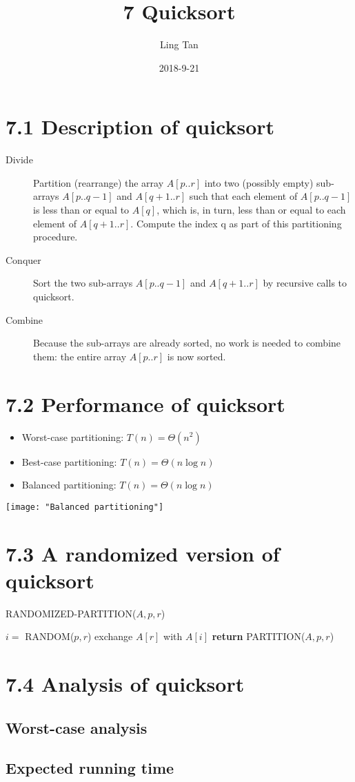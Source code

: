 \documentclass[a4paper]{article}
\title{7 Quicksort}
\author{Ling Tan}
\date{2018-9-21}
\begin{document}
\maketitle

\section*{7.1 Description of quicksort}
\begin{description}
\item[Divide] Partition (rearrange) the array $A[p..r]$ into two (possibly empty) sub-arrays $A[p..q-1]$ and $A[q+1..r]$ such that each element of $A[p..q-1]$ is less than or equal to $A[q]$, which is, in turn, less than or equal to each element of $A[q+1..r]$. Compute the index q as part of this partitioning procedure.
\item[Conquer] Sort the two sub-arrays $A[p..q-1]$ and $A[q+1..r]$ by recursive calls to quicksort.
\item[Combine] Because the sub-arrays are already sorted, no work is needed to combine them: the entire array $A[p..r]$ is now sorted.
\end{description}
\section*{7.2 Performance of quicksort}
\begin{itemize}
    \item Worst-case partitioning: $T(n)=\Theta(n^2)$
    \item Best-case partitioning: $T(n)=\Theta(n\log n)$
    \item Balanced partitioning: $T(n)=\Theta(n\log n)$
\end{itemize}
\texttt{[image: "Balanced partitioning"]}
\section*{7.3 A randomized version of quicksort}
\begin{algorithm}[H]%
    \caption{RANDOMIZED-PARTITION($A,p,r$)}
    \begin{algorithmic}[1] %
        \State $i=$ RANDOM($p,r$)
        \State exchange $A[r]$ with $A[i]$
        \State \textbf{return }PARTITION($A,p,r$)
    \end{algorithmic}
\end{algorithm}
\section*{7.4 Analysis of quicksort}
\subsection*{Worst-case analysis}
\subsection*{Expected running time}
\end{document}
